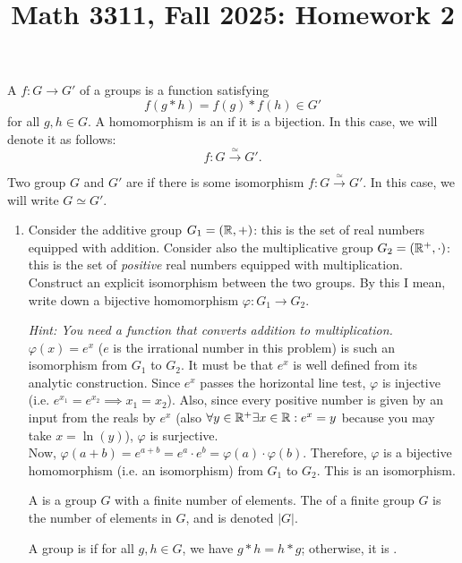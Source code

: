 \documentclass{amsart}
\title{Math 3311, Fall 2025: Homework 2}
\begin{document}
\maketitle

A  $f:G\to G'$ of a groups is a function satisfying
\[
f(g*h) = f(g)*f(h)\in G'
\]
for all $g,h\in G$. A homomorphism is an  if it is a bijection. In this case, we will denote it as follows:
\[
f:G\xrightarrow{\simeq}G'.
\]

Two group $G$ and $G'$ are  if there is some isomorphism $f:G\xrightarrow{\simeq}G'$. In this case, we will write $G\simeq G'$.


\begin{enumerate}[itemsep=0.4in]

\item Consider the additive group $G_1=(\mathbb{R},+)$: this is the set of real numbers equipped with addition. Consider also the multiplicative group $G_2=(\mathbb{R}^+,\cdot)$: this is the set of \emph{positive} real numbers equipped with multiplication. Construct an explicit isomorphism between the two groups. By this I mean, write down a bijective homomorphism $\varphi:G_1\to G_2$.

\emph{Hint: You need a function that converts addition to multiplication.}\\

$\varphi(x)=e^x$ ($e$ is the irrational number in this problem) is such an isomorphism from $G_1$ to $G_2$. 
It must be that $e^x$ is well defined from its analytic construction.  Since $e^x$ passes the horizontal line test, $\varphi$ is injective (i.e. $e^{x_1}=e^{x_2}\implies x_1=x_2$). Also, since every positive number is given by an input from the reals by $e^x$ (also $\forall y\in\mathbb{R}^+\exists x\in\mathbb{R}:e^x=y$ because you may take $x=\ln(y)$), $\varphi$ is surjective.\\

Now, $\varphi(a+b)=e^{a+b}=e^a\cdot e^b=\varphi(a)\cdot\varphi(b)$. Therefore, $\varphi$ is a bijective homomorphism (i.e. an isomorphism) from $G_1$ to $G_2$. This is an isomorphism.


\vspace{0.2in}

A  is a group $G$ with a finite number of elements. The  of a finite group $G$ is the number of elements in $G$, and is denoted $|G|$.

A group is  if for all $g,h\in G$, we have $g*h = h*g$; otherwise, it is .


\end{enumerate}
\end{document}
